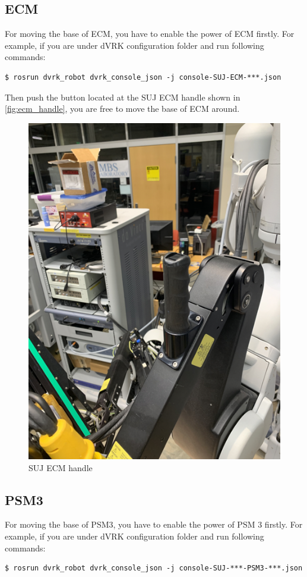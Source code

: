 \subsection{ECM}

For moving the base of ECM, you have to enable the power of ECM firstly. For example, if you are under dVRK configuration folder and run following commands: 

\begin{verbatim}
$ rosrun dvrk_robot dvrk_console_json -j console-SUJ-ECM-***.json
\end{verbatim}

Then push the button located at the SUJ ECM handle shown in \autoref{fig:ecm_handle}, you are free to move the base of ECM around.

\begin{figure}[H]
    \centering
    \includegraphics[width=0.6\linewidth]{figures/ECM_handle.png}
    \caption{SUJ ECM handle}
    \label{fig:ecm_handle}
\end{figure}


\subsection{PSM3}

For moving the base of PSM3, you have to enable the power of PSM 3 firstly. For example, if you are under dVRK configuration folder and run following commands: 

\begin{verbatim}
$ rosrun dvrk_robot dvrk_console_json -j console-SUJ-***-PSM3-***.json
\end{verbatim}

